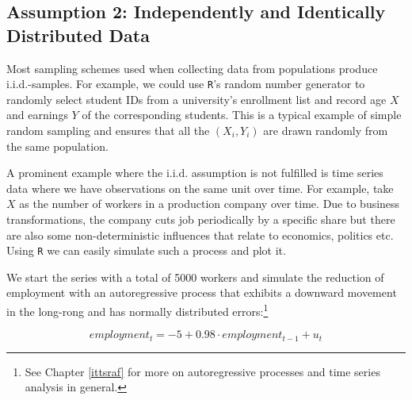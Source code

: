 \documentclass[]{book}
\let\rmarkdownfootnote\footnote%
\def\footnote{\protect\rmarkdownfootnote}
\theoremstyle{definition}
\theoremstyle{definition}
\theoremstyle{definition}
\theoremstyle{remark}
\begin{document}
\subsection*{Assumption 2: Independently and Identically Distributed
Data}\label{assumption-2-independently-and-identically-distributed-data}

Most sampling schemes used when collecting data from populations produce
i.i.d.-samples. For example, we could use \texttt{R}'s random number
generator to randomly select student IDs from a university's enrollment
list and record age \(X\) and earnings \(Y\) of the corresponding
students. This is a typical example of simple random sampling and
ensures that all the \((X_i, Y_i)\) are drawn randomly from the same
population.

A prominent example where the i.i.d. assumption is not fulfilled is time
series data where we have observations on the same unit over time. For
example, take \(X\) as the number of workers in a production company
over time. Due to business transformations, the company cuts job
periodically by a specific share but there are also some
non-deterministic influences that relate to economics, politics etc.
Using \texttt{R} we can easily simulate such a process and plot it.

We start the series with a total of 5000 workers and simulate the
reduction of employment with an autoregressive process that exhibits a
downward movement in the long-rong and has normally distributed
errors:\footnote{See Chapter \ref{ittsraf} for more on autoregressive
  processes and time series analysis in general.}

\[ employment_t = -5 + 0.98 \cdot employment_{t-1} + u_t \]
\end{document}
